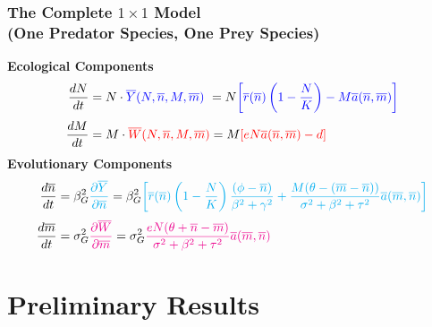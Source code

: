 \documentclass[10pt]{beamer}
\begin{document}
\begin{frame}
	\frametitle{The Complete $1\times1$ Model \\ (One Predator Species, One Prey Species)}
	{\bf Ecological Components}
	\begin{align*}
		\frac{dN}{dt} &= N\cdot {\color{blue}\overline{Y}(N, \overline{n}, M, \overline{m})}\ = N{\color{blue}\left[\overline{r}(\overline{n})\left(1 - \frac{N}{K}\right) - M\overline{a}(\overline{n}, \overline{m})\right]}\\[.1cm]
		\frac{dM}{dt} &= M\cdot {\color{red}\overline{W}(N, \overline{n}, M, \overline{m})} = M{\color{red}\left[eN\overline{a}(\overline{n}, \overline{m}) - d\right]}
	\end{align*}
	{\bf Evolutionary Components}
	\begin{align*}
		\frac{d\overline{n}}{dt} &= \beta_G^2{\color{cyan}\frac{\partial \overline{Y}}{\partial \overline{n}}} = \beta_G^2{\color{cyan}\left[\overline{r}(\overline{n})\left(1 - \frac{N}{K}\right)\frac{(\phi - \overline{n})}{\beta^2 + \gamma^2} + \frac{M(\theta - (\overline{m} - \overline{n}))}{\sigma^2 + \beta^2 + \tau^2} \overline{a}(\overline{m}, \overline{n})\right]}\\[.1cm]
		\frac{d\overline{m}}{dt} &= \sigma_G^2{\color{magenta}\frac{\partial \overline{W}}{\partial \overline{m}}} = \sigma_G^2{\color{magenta}\frac{eN(\theta + \overline{n} - \overline{m})}{\sigma^2 + \beta^2 + \tau^2} \overline{a}(\overline{m}, \overline{n})}
	\end{align*}
\end{frame}

\section{Preliminary Results}
\end{document}
